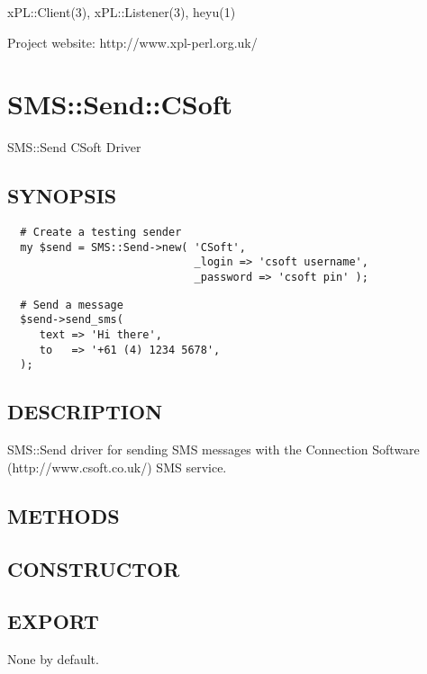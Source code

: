 \documentclass[12pt,a4paper]{article}
\begin{document}
xPL::Client(3), xPL::Listener(3), heyu(1)



Project website: http://www.xpl-perl.org.uk/

\newpage
\section{SMS::Send::CSoft\label{SMS::Send::CSoft}}


SMS::Send CSoft Driver

\subsection*{SYNOPSIS\label{SMS::Send::CSoft_SYNOPSIS}}
\begin{verbatim}
  # Create a testing sender
  my $send = SMS::Send->new( 'CSoft',
                             _login => 'csoft username',
                             _password => 'csoft pin' );
\end{verbatim}
\begin{verbatim}
  # Send a message
  $send->send_sms(
     text => 'Hi there',
     to   => '+61 (4) 1234 5678',
  );
\end{verbatim}
\subsection*{DESCRIPTION\label{SMS::Send::CSoft_DESCRIPTION}}


SMS::Send driver for sending SMS messages with the Connection
Software (http://www.csoft.co.uk/) SMS service.

\subsection*{METHODS\label{SMS::Send::CSoft_METHODS}}
\subsection*{CONSTRUCTOR\label{SMS::Send::CSoft_CONSTRUCTOR}}
\subsection*{EXPORT\label{SMS::Send::CSoft_EXPORT}}


None by default.
\end{document}
